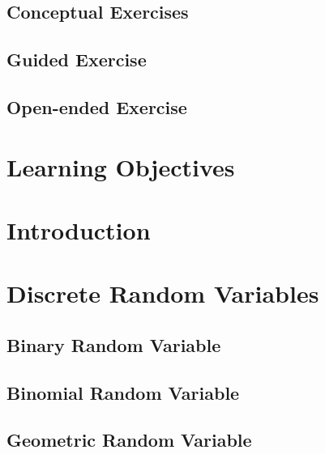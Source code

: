 \documentclass[
]{krantz}
\begin{document}
\hypertarget{conceptual-exercises-1}{%
\subsection{Conceptual Exercises}\label{conceptual-exercises-1}}

\hypertarget{guided-exercise}{%
\subsection{Guided Exercise}\label{guided-exercise}}

\hypertarget{open-ended-exercise}{%
\subsection{Open-ended Exercise}\label{open-ended-exercise}}

\hypertarget{learning-objectives-2}{%
\section{Learning Objectives}\label{learning-objectives-2}}

\hypertarget{introduction}{%
\section{Introduction}\label{introduction}}

\hypertarget{discrete-random-variables}{%
\section{Discrete Random Variables}\label{discrete-random-variables}}

\hypertarget{sec-binary}{%
\subsection{Binary Random Variable}\label{sec-binary}}

\hypertarget{sec-binomial}{%
\subsection{Binomial Random Variable}\label{sec-binomial}}

\hypertarget{geometric-random-variable}{%
\subsection{Geometric Random Variable}\label{geometric-random-variable}}
\end{document}
